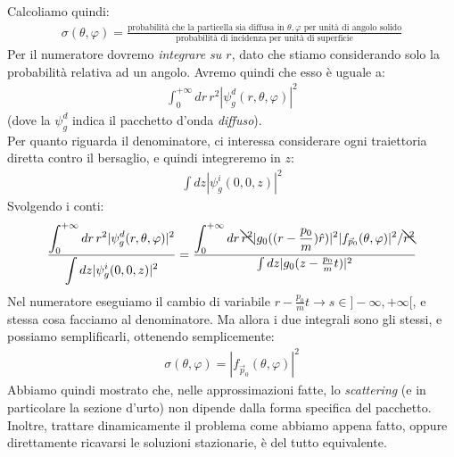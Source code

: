 \documentclass[../../FisicaTeorica.tex]{subfiles}
\begin{document}
Calcoliamo quindi:
\begin{align*}
\sigma(\theta,\varphi) = \frac{\text{probabilità che la particella sia diffusa in $\theta,\varphi$ per unità di angolo solido}}{\text{probabilità di incidenza per unità di superficie}}
\end{align*}
Per il numeratore dovremo \textit{integrare su $r$}, dato che stiamo considerando solo la probabilità relativa ad un angolo. Avremo quindi che esso è uguale a:
\begin{align*}
\int_0^{+\infty} dr\, r^2 |\psi_g^d(r,\theta,\varphi)|^2
\end{align*}
(dove la $\psi_g^d$ indica il pacchetto d'onda \textit{diffuso}).\\
Per quanto riguarda il denominatore, ci interessa considerare ogni traiettoria diretta contro il bersaglio, e quindi integreremo in $z$:
\begin{align*}
\int dz |\psi_g^i(0,0,z)|^2
\end{align*}
Svolgendo i conti:
\begin{align*}
\frac{\displaystyle \int_0^{+\infty} dr\, r^2 |\psi_g^d(r,\theta,\varphi)|^2}{\displaystyle \int dz |\psi_g^i(0,0,z)|^2} =
\frac{\displaystyle \int_0^{+\infty} dr\,\bcancel{r^2 }|g_0((r-\frac{p_0}{m})\hat{r})|^2 |f_{\vec{p}_0}(\theta,\varphi)|^2 /\bcancel{r^2}}{\int dz |g_0(z-\frac{p_0}{m}t)|^2}
\end{align*}
Nel numeratore eseguiamo il cambio di variabile $r-\frac{p_0}{m}t \to s \in ]-\infty,+\infty[$, e stessa cosa facciamo al denominatore. Ma allora i due integrali sono gli stessi, e possiamo semplificarli, ottenendo semplicemente:
\begin{align*}
\sigma(\theta,\varphi)=|f_{\vec{p}_0}(\theta,\varphi)|^2
\end{align*}
Abbiamo quindi mostrato che, nelle approssimazioni fatte, lo \textit{scattering} (e in particolare la sezione d'urto) non dipende dalla forma specifica del pacchetto. Inoltre, trattare dinamicamente il problema come abbiamo appena fatto, oppure direttamente ricavarsi le soluzioni stazionarie, è del tutto equivalente.\\
\end{document}
